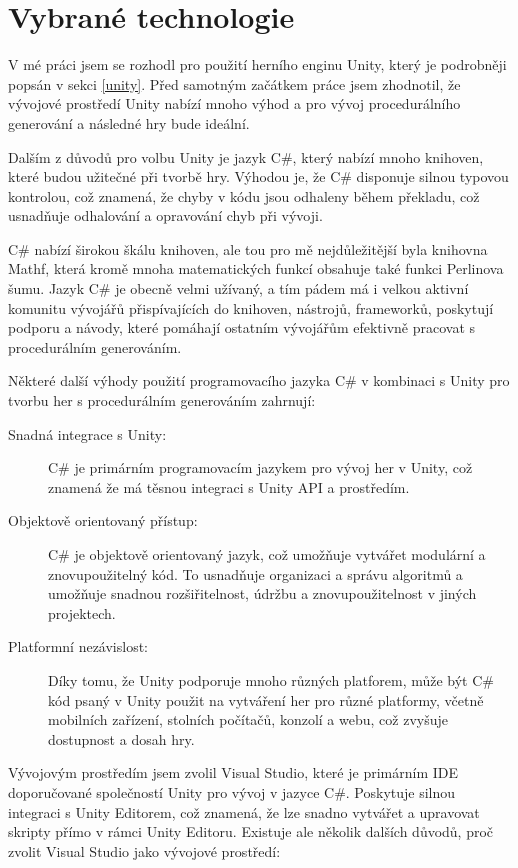 \section{Vybrané technologie}
V mé práci jsem se rozhodl pro použití herního enginu Unity, který je podrobněji popsán v sekci \ref{unity}. Před samotným začátkem práce jsem zhodnotil, že vývojové prostředí Unity nabízí mnoho výhod a pro vývoj procedurálního generování a následné hry bude ideální.

Dalším z důvodů pro volbu Unity je jazyk C\#, který nabízí mnoho knihoven, které budou užitečné při tvorbě hry. Výhodou je, že C\# disponuje silnou typovou kontrolou, což znamená, že chyby v kódu jsou odhaleny během překladu, což usnadňuje odhalování a opravování chyb při vývoji.

C\# nabízí širokou škálu knihoven, ale tou pro mě nejdůležitější byla knihovna Mathf, která kromě mnoha matematických funkcí obsahuje také funkci Perlinova šumu. Jazyk C\# je obecně velmi užívaný, a tím pádem má i velkou aktivní komunitu vývojářů přispívajících do knihoven, nástrojů, frameworků, poskytují podporu a návody, které pomáhají ostatním vývojářům efektivně pracovat s procedurálním generováním. 

Některé další výhody použití programovacího jazyka C\# v kombinaci s Unity pro tvorbu her s procedurálním generováním zahrnují:

\begin{description}
	\item [Snadná integrace s Unity:] C\# je primárním programovacím jazykem pro vývoj her v Unity, což znamená že má těsnou integraci s Unity API a prostředím.
	\item [Objektově orientovaný přístup:] C\# je objektově orientovaný jazyk, což umožňuje vytvářet modulární a znovupoužitelný kód. To usnadňuje organizaci a správu algoritmů a umožňuje snadnou rozšiřitelnost, údržbu a znovupoužitelnost v jiných projektech.
	\item [Platformní nezávislost:] Díky tomu, že Unity podporuje mnoho různých platforem, může být C\# kód psaný v Unity použit na vytváření her pro různé platformy, včetně mobilních zařízení, stolních počítačů, konzolí a webu, což zvyšuje dostupnost a dosah hry.
\end{description}

Vývojovým prostředím jsem zvolil Visual Studio, které je primárním IDE doporučované společností Unity pro vývoj v jazyce C\#. Poskytuje silnou integraci s Unity Editorem, což znamená, že lze snadno vytvářet a upravovat skripty přímo v rámci Unity Editoru. Existuje ale několik dalších důvodů, proč zvolit Visual Studio jako vývojové prostředí:
 
